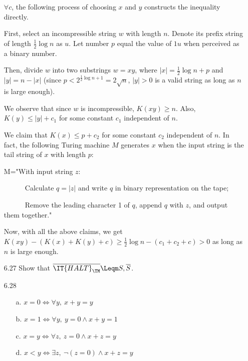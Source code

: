 \begin{itemize}
	$ \forall c $, the following process of choosing $ x $ and $ y $ constructs the inequality directly.
	
	First, select an incompressible string $ w $ with length $ n $. Denote its prefix string of length $ \frac{1}{2} \log n $ as $ u $. Let number $ p $ equal the value of $ 1u $ when perceived as a  binary number.
	
	Then, divide $ w $ into two substrings $ w=xy $, where $ \left| x \right| = \frac{1}{2} \log n + p $ and $ \left| y \right| = n - \left| x \right| $ (since $ p < 2^{\frac{1}{2} \log n + 1} = 2 \sqrt{n}$, $ \left| y \right| > 0 $ is a valid string as long as $ n $ is large enough).
	
	We observe that since $ w $ is incompressible, $ K(xy) \ge n $. Also, $ K(y) \le \left| y \right| + c_1 $ for some constant $ c_1 $ independent of $ n $.
	
	We claim that $ K(x) \le p + c_2 $ for some constant $ c_2 $ independent of $ n $. In fact, the following Turing machine $ M $ generates $ x $ when the input string is the tail string of $ x $ with length $ p $:
	
	M="With input string $ z $:
	
	~~~~~~Calculate $ q = \left| z \right| $ and write $ q $ in binary representation on the tape;
	
	~~~~~~Remove the leading character 1 of $ q $, append $ q $ with $ z $, and output them together."
	
	Now, with all the above claims, we get $ K(xy) - \left( K(x) + K(y) + c \right) \ge \frac{1}{2} \log n - \left( c_1 + c_2 + c \right) > 0 $ as long as $ n $ is large enough.
	
	\item[6.27]
	Show that $\overline{\IT{HALT}_{\TM}} \Leqm S, \overline{S}$.
	
	\item[6.28]
	\begin{enumerate}
		\item[a.] $x = 0 \iff \forall y,\ x+y=y$
		\item[b.] $x = 1 \iff \forall y,\ y=0 \wedge x+y=1$ 
		\item[c.] $x = y \iff \forall z,\ z=0 \wedge x+z=y$
		\item[d.] $x < y \iff \exists z,\ \neg(z = 0) \wedge x + z = y$
	\end{enumerate}
	
\end{itemize}
